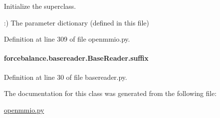 Initialize the superclass. 

\-:) The parameter dictionary (defined in this file) 

Definition at line 309 of file openmmio.\-py.

\hypertarget{classforcebalance_1_1basereader_1_1BaseReader_ab2aba0f349b78cb3c1e11c35f56d6bdf}{
\paragraph[{suffix}]{\setlength{\rightskip}{0pt plus 5cm}forcebalance.\-basereader.\-Base\-Reader.\-suffix\hspace{0.3cm}{\ttfamily [inherited]}}}\label{classforcebalance_1_1basereader_1_1BaseReader_ab2aba0f349b78cb3c1e11c35f56d6bdf}


Definition at line 30 of file basereader.\-py.



The documentation for this class was generated from the following file\-:\begin{DoxyCompactItemize}
\item 
\hyperlink{openmmio_8py}{openmmio.\-py}\end{DoxyCompactItemize}
